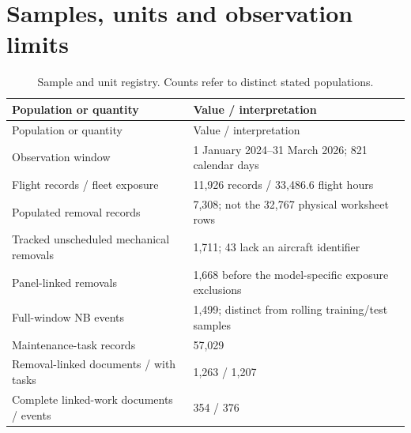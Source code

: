 \section{Samples, units and observation limits}

\begin{small}

\setlength{\tabcolsep}{4pt}

\begin{longtable}{p{6cm}p{9cm}}

\caption{Sample and unit registry. Counts refer to distinct stated populations.}\label{tab:s-samples}\\

\toprule

Population or quantity & Value / interpretation \\

\midrule

\endfirsthead

\toprule

Population or quantity & Value / interpretation \\

\midrule

\endhead

Observation window & 1 January 2024--31 March 2026; 821 calendar days \\

Flight records / fleet exposure & 11,926 records / 33,486.6 flight hours \\

Populated removal records & 7,308; not the 32,767 physical worksheet rows \\

Tracked unscheduled mechanical removals & 1,711; 43 lack an aircraft identifier \\

Panel-linked removals & 1,668 before the model-specific exposure exclusions \\

Full-window NB events & 1,499; distinct from rolling training/test samples \\

Maintenance-task records & 57,029 \\

Removal-linked documents / with tasks & 1,263 / 1,207 \\

Complete linked-work documents / events & 354 / 376 \\


\end{longtable}
\end{small}
